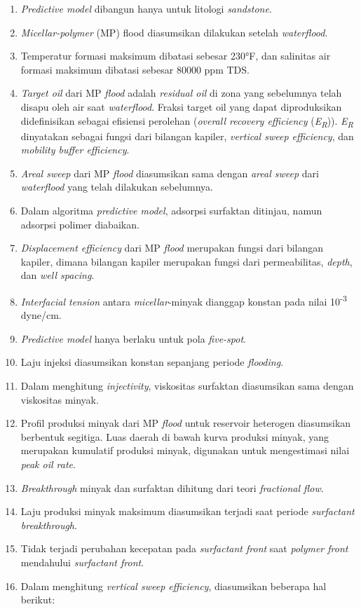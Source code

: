\documentclass[
]{book}
\providecommand{\tightlist}{%
  \setlength{\itemsep}{0pt}\setlength{\parskip}{0pt}}
\begin{document}
\begin{enumerate}
\def\labelenumi{\arabic{enumi}.}
\tightlist
\item
  \emph{Predictive model} dibangun hanya untuk litologi \emph{sandstone}.
\item
  \emph{Micellar-polymer} (MP) flood diasumsikan dilakukan setelah \emph{waterflood}.
\item
  Temperatur formasi maksimum dibatasi sebesar 230°F, dan salinitas air formasi maksimum dibatasi sebesar 80000 ppm TDS.
\item
  \emph{Target oil} dari MP \emph{flood} adalah \emph{residual oil} di zona yang sebelumnya telah disapu oleh air saat \emph{waterflood}. Fraksi target oil yang dapat diproduksikan didefinisikan sebagai efisiensi perolehan (\emph{overall recovery efficiency} (\emph{E\textsubscript{R}})). \emph{E\textsubscript{R}} dinyatakan sebagai fungsi dari bilangan kapiler, \emph{vertical sweep efficiency}, dan \emph{mobility buffer efficiency}.
\item
  \emph{Areal sweep} dari MP \emph{flood} diasumsikan sama dengan \emph{areal sweep} dari \emph{waterflood} yang telah dilakukan sebelumnya.
\item
  Dalam algoritma \emph{predictive model}, adsorpsi surfaktan ditinjau, namun adsorpsi polimer diabaikan.
\item
  \emph{Displacement efficiency} dari MP \emph{flood} merupakan fungsi dari bilangan kapiler, dimana bilangan kapiler merupakan fungsi dari permeabilitas, \emph{depth}, dan \emph{well spacing}.
\item
  \emph{Interfacial tension} antara \emph{micellar}-minyak dianggap konstan pada nilai 10\textsuperscript{-3} dyne/cm.
\item
  \emph{Predictive model} hanya berlaku untuk pola \emph{five-spot}.
\item
  Laju injeksi diasumsikan konstan sepanjang periode \emph{flooding}.
\item
  Dalam menghitung \emph{injectivity}, viskositas surfaktan diasumsikan sama dengan viskositas minyak.
\item
  Profil produksi minyak dari MP \emph{flood} untuk reservoir heterogen diasumsikan berbentuk segitiga. Luas daerah di bawah kurva produksi minyak, yang merupakan kumulatif produksi minyak, digunakan untuk mengestimasi nilai \emph{peak oil rate}.
\item
  \emph{Breakthrough} minyak dan surfaktan dihitung dari teori \emph{fractional flow}.
\item
  Laju produksi minyak maksimum diasumsikan terjadi saat periode \emph{surfactant breakthrough}.
\item
  Tidak terjadi perubahan kecepatan pada \emph{surfactant front} saat \emph{polymer front} mendahului \emph{surfactant front}.
\item
  Dalam menghitung \emph{vertical sweep efficiency}, diasumsikan beberapa hal berikut:


\end{enumerate}
\end{document}
